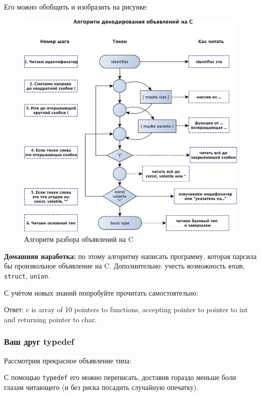\documentclass[a4paper,12pt,oneside]{article}
\begin{document}
Его можно обобщить и изобразить на рисунке:
\begin{figure}[h!]
\centering
\includegraphics[width=1.0\textwidth]{illustrations/cdecls-crop.pdf}
\caption{Алгоритм разбора объявлений на C}
\label{fig:cdecl_parse}
\end{figure}

\textbf{Домашняя наработка:} по этому алгоритму написать программу, которая парсила бы произвольное объявление на C. Дополнительно: учесть возможность \lstinline!enum!, \lstinline!struct!, \lstinline!union!.

С учётом новых знаний попробуйте прочитать самостоятельно:



Ответ: c is array of 10 pointers to functions, accepting pointer to pointer to int and returning pointer to char.

\subsubsection{Ваш друг typedef}

Рассмотрим прекрасное объявление типа:



С помощью \lstinline!typedef! его можно переписать, доставив гораздо меньше боли глазам читающего (и без риска посадить случайную опечатку).
\end{document}
